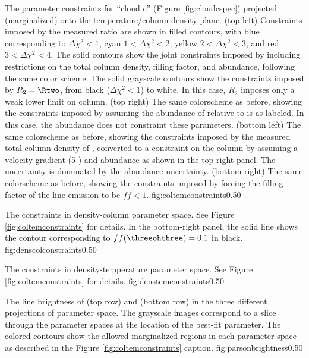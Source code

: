 {The parameter constraints for ``cloud c'' (Figure \ref{fig:cloudcspec})
projected (marginalized) onto the temperature/column density plane.\newline
(top left) Constraints imposed by the measured ratio \Rone are shown in filled contours,
with blue corresponding to $\Delta\chi^2 < 1$, cyan $1 < \Delta\chi^2 < 2$,
yellow $2 < \Delta\chi^2 < 3$, and red $3 < \Delta\chi^2 < 4$.  The solid
contours show the joint constraints imposed by including restrictions on the
total column density, filling factor, and abundance, following the same color
scheme.  The solid grayscale contours show the constraints imposed by
$R_2=\Rtwo$, from black ($\Delta\chi^2 < 1$) to white.  In this case, $R_2$
imposes only a weak lower limit on column. \newline
(top right) The same colorscheme as before, showing the constraints imposed by
assuming the abundance of \para relative to \hh is as labeled.  In this case,
the abundance does not constraint these parameters. \newline
(bottom left) The same colorscheme as before, showing the constraints imposed
by the measured total column density of \hh, converted to a constraint on the
\para column by assuming a velocity gradient (5 \kms \perpc) and abundance as
shown in the top right panel.  The uncertainty is dominated by the abundance
uncertainty.  \newline
(bottom right) The same colorscheme as before, showing the constraints imposed
by forcing the filling factor of the line emission to be $ff < 1$.
}
{fig:coltemconstraints}{0.5}{0}

{The constraints in density-column parameter space.
See Figure \ref{fig:coltemconstraints} for details.  In the bottom-right panel, the
solid line shows the contour corresponding to $ff(\threeohthree)=0.1$ in
black.}
{fig:denscolconstraints}{0.5}{0}

{The constraints in density-temperature parameter space.
See Figure \ref{fig:coltemconstraints} for details.}
{fig:denstemconstraints}{0.5}{0}

{The line brightness of \para \threeohthree (top row) and \para \threetwoone
(bottom row) in the three different projections of parameter space.  The
grayscale images correspond to a slice through the parameter spaces at the
location of the best-fit parameter.  The colored contours show the allowed
marginalized regions in each parameter space as described in the
Figure \ref{fig:coltemconstraints} caption.}
{fig:parsonbrightness}{0.5}{0}

